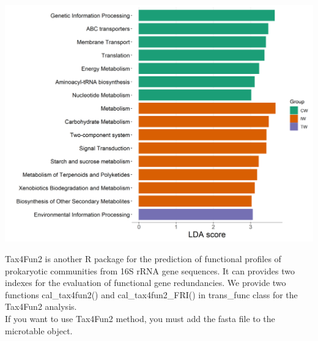 \documentclass[
]{book}
\begin{document}
\begin{center}\includegraphics[width=600px]{Images/plot_lefse_bar_tax4fun} \end{center}

Tax4Fun2 \citep{Wemheuer_Tax4Fun2_2020} is another R package for the prediction of functional profiles of prokaryotic communities from 16S rRNA gene sequences.
It can provides two indexes for the evaluation of functional gene redundancies.
We provide two functions cal\_tax4fun2() and cal\_tax4fun2\_FRI() in trans\_func class for the Tax4Fun2 analysis.\\
If you want to use Tax4Fun2 method, you must add the fasta file to the microtable object.
\end{document}
